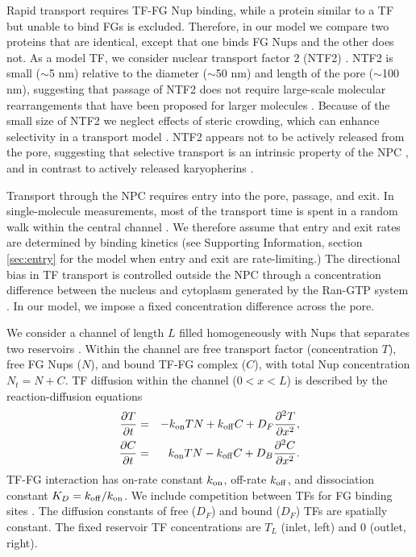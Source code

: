 Rapid transport requires TF-FG Nup binding, while a protein similar to
a TF but unable to bind FGs is excluded. Therefore, in our model we
compare two proteins that are identical, except that one binds FG Nups
and the other does not.  As a model TF, we consider nuclear transport
factor 2 (NTF2) \cite{ribbeck98}. NTF2 is small ($\sim$5 nm) relative
to the diameter ($\sim$50 nm) and length of the pore ($\sim$100 nm),
suggesting that passage of NTF2 does not require large-scale molecular
rearrangements that have been proposed for larger molecules
\cite{lowe15, frenkiel-krispin10}. Because of the small size of NTF2 we
neglect effects of steric crowding, which can enhance selectivity in a
transport model \cite{zilman07}.  NTF2 appears not to be actively
released from the pore, suggesting that selective transport is an
intrinsic property of the NPC \cite{mincer11, zilman07}, and in
contrast to actively released karyopherins \cite{lowe15, mincer11,
  gorlich96, gilchrist02}.

Transport through the NPC requires entry into the pore, passage, and
exit. In single-molecule measurements, most of the transport time is
spent in a random walk within the central channel \cite{yang04,
  tu13}. We therefore assume that entry and exit rates are determined
by binding kinetics (see Supporting Information, section
\ref{sec:entry} for the model when entry and exit are rate-limiting.)
The directional bias in TF transport is controlled outside the NPC
through a concentration difference between the nucleus and cytoplasm
generated by the Ran-GTP system \cite{riddick05}.  In our model, we
impose a fixed concentration difference across the pore.


We consider a channel of length $L$ filled homogeneously with Nups
that separates two reservoirs .  Within the
channel are free transport factor (concentration $T$), free FG Nups
($N$), and bound TF-FG complex ($C$), with total Nup concentration
$N_t= N+C$.  TF diffusion within the channel ($0<x<L$) is described by
the reaction-diffusion equations
\begin{eqnarray}
  \frac{\partial T}{\partial t} &=& -k_{\rm on} T N+k_{\rm off} C +D_F
       \frac{\partial^2 T}{\partial x^2},\label{eq:continuum_main} 
   \\ 
  \frac{\partial C}{\partial t} &=& k_{\rm on} T N -k_{\rm off} C + 
        D_B \frac{\partial^2 C}{\partial x^2} .
\label{eq:continuum_main_2} 
\end{eqnarray}
TF-FG interaction has on-rate constant $k_{\rm on}$, off-rate $k_{\rm off}$, and
dissociation constant $K_D =k_{\rm off}/k_{\rm on}$.  We include competition
between TFs for FG binding sites \cite{timney16}.  The
diffusion constants of free ($D_F$) and bound ($D_F$) TFs are
spatially constant. The fixed reservoir TF concentrations are $T_L$
(inlet, left) and 0 (outlet, right).

